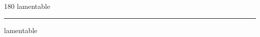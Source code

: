 
\begin{frame}
\begin{center}
\begin{turn}{180}
{\fontsize{2.5cm}{1em}\selectfont lamentable}
\end{turn}
\vspace{1em}\par  
\hrule
\vspace{1em}\par  
{\fontsize{2.5cm}{1em}\selectfont lamentable}
\end{center}
\end{frame}

